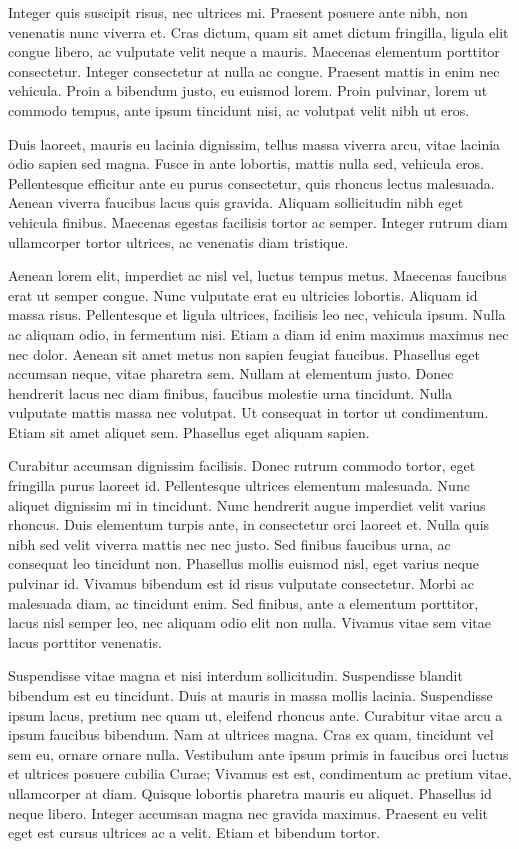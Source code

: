 \documentclass[a4paper,10pt,twoside]{article} %
\begin{document}
Integer quis suscipit risus, nec ultrices mi.
Praesent posuere ante nibh, non venenatis nunc viverra et.
Cras dictum, quam sit amet dictum fringilla, ligula elit congue libero, ac vulputate velit neque a mauris.
Maecenas elementum porttitor consectetur.
Integer consectetur at nulla ac congue.
Praesent mattis in enim nec vehicula.
Proin a bibendum justo, eu euismod lorem.
Proin pulvinar, lorem ut commodo tempus, ante ipsum tincidunt nisi, ac volutpat velit nibh ut eros.

Duis laoreet, mauris eu lacinia dignissim, tellus massa viverra arcu, vitae lacinia odio sapien sed magna.
Fusce in ante lobortis, mattis nulla sed, vehicula eros.
Pellentesque efficitur ante eu purus consectetur, quis rhoncus lectus malesuada.
Aenean viverra faucibus lacus quis gravida.
Aliquam sollicitudin nibh eget vehicula finibus.
Maecenas egestas facilisis tortor ac semper.
Integer rutrum diam ullamcorper tortor ultrices, ac venenatis diam tristique.

Aenean lorem elit, imperdiet ac nisl vel, luctus tempus metus.
Maecenas faucibus erat ut semper congue.
Nunc vulputate erat eu ultricies lobortis.
Aliquam id massa risus.
Pellentesque et ligula ultrices, facilisis leo nec, vehicula ipsum.
Nulla ac aliquam odio, in fermentum nisi.
Etiam a diam id enim maximus maximus nec nec dolor.
Aenean sit amet metus non sapien feugiat faucibus.
Phasellus eget accumsan neque, vitae pharetra sem.
Nullam at elementum justo.
Donec hendrerit lacus nec diam finibus, faucibus molestie urna tincidunt.
Nulla vulputate mattis massa nec volutpat.
Ut consequat in tortor ut condimentum.
Etiam sit amet aliquet sem.
Phasellus eget aliquam sapien.

Curabitur accumsan dignissim facilisis.
Donec rutrum commodo tortor, eget fringilla purus laoreet id.
Pellentesque ultrices elementum malesuada.
Nunc aliquet dignissim mi in tincidunt.
Nunc hendrerit augue imperdiet velit varius rhoncus.
Duis elementum turpis ante, in consectetur orci laoreet et.
Nulla quis nibh sed velit viverra mattis nec nec justo.
Sed finibus faucibus urna, ac consequat leo tincidunt non.
Phasellus mollis euismod nisl, eget varius neque pulvinar id.
Vivamus bibendum est id risus vulputate consectetur.
Morbi ac malesuada diam, ac tincidunt enim.
Sed finibus, ante a elementum porttitor, lacus nisl semper leo, nec aliquam odio elit non nulla.
Vivamus vitae sem vitae lacus porttitor venenatis.

Suspendisse vitae magna et nisi interdum sollicitudin.
Suspendisse blandit bibendum est eu tincidunt.
Duis at mauris in massa mollis lacinia.
Suspendisse ipsum lacus, pretium nec quam ut, eleifend rhoncus ante.
Curabitur vitae arcu a ipsum faucibus bibendum.
Nam at ultrices magna.
Cras ex quam, tincidunt vel sem eu, ornare ornare nulla.
Vestibulum ante ipsum primis in faucibus orci luctus et ultrices posuere cubilia Curae; Vivamus est est, condimentum ac pretium vitae, ullamcorper at diam.
Quisque lobortis pharetra mauris eu aliquet.
Phasellus id neque libero.
Integer accumsan magna nec gravida maximus.
Praesent eu velit eget est cursus ultrices ac a velit.
Etiam et bibendum tortor.
\end{document}
